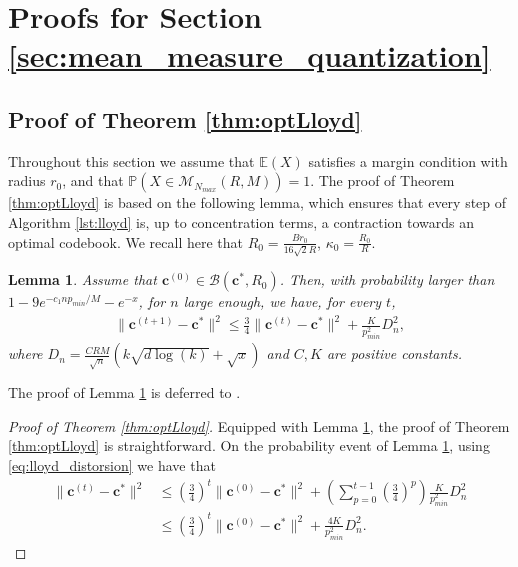 \documentclass[noinfoline,preprint]{article}
\newtheorem{lem}[theorem]{Lemma}
\newcommand{\cb}{\mathbf{c}}
\renewcommand{\1}{\mathds 1}
\newcommand{\B}{\mathcal{B}}
\begin{document}
\section{Proofs for Section \ref{sec:mean_measure_quantization}}\label{sec:proof_sec_mean_measure_quantization}
\subsection{Proof of Theorem \ref{thm:optLloyd}}\label{sec:proof_thm_optLloyd}
Throughout this section we assume that $\mathbb{E}(X)$ satisfies a margin condition with radius $r_0$, and that $\mathbb{P}(X \in \mathcal{M}_{N_{max}}(R,M)) =1$. 
The proof of Theorem \ref{thm:optLloyd} is based on the following lemma, which ensures that every step of Algorithm \ref{lst:lloyd} is, up to concentration terms, a contraction towards an optimal codebook. We recall here that $R_0= \frac{Br_0}{16\sqrt{2}R}$, $\kappa_0 = \frac{R_0}{R}$.
\begin{lem}\label{lem:Lloyd_one_iteration}
Assume that $\cb^{(0)} \in \B(\cb^*,R_0)$. Then, with probability larger than $1-9e^{ -c_1 n p_{min}/M} - e^{-x}$, for $n$ large enough, we have, for every $t$,
\begin{align}\label{eq:lloyd_distorsion}
\|\cb^{(t+1)} - \cb^*\|^2 \leq \frac{3}{4} \|\cb^{(t)} - \cb^*\|^2 + \frac{K}{p_{min}^2} D_n^2,
\end{align}
where $D_n = \frac{C R M}{\sqrt{n}}  \left (k \sqrt{d\log(k)}+ \sqrt{x} \right )$ and $C,K$ are positive constants.
\end{lem}
The proof of Lemma \ref{lem:Lloyd_one_iteration} is deferred to .
\begin{proof}[Proof of Theorem \ref{thm:optLloyd}]
Equipped with Lemma \ref{lem:Lloyd_one_iteration}, the proof of Theorem \ref{thm:optLloyd} is straightforward.  On the probability event of Lemma \ref{lem:Lloyd_one_iteration}, using \eqref{eq:lloyd_distorsion} we have that 
\begin{align*}
\| \cb^{(t)} - \cb^* \|^2 & \leq \left ( \frac{3}{4} \right )^{t}\| \cb^{(0)} - \cb^*\|^2 + \left ( \sum_{p=0}^{t-1} \left ( \frac{3}{4} \right )^p \right ) \frac{K}{p_{min}^2} D_n^2 \\
& \leq \left ( \frac{3}{4} \right )^{t}\| \cb^{(0)} - \cb^*\|^2 + \frac{4K}{p_{min}^2}D_n^2.
\end{align*}
\end{proof}
\end{document}
